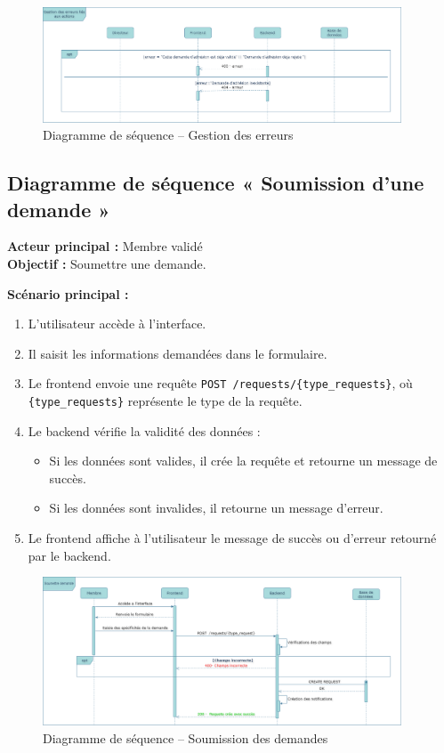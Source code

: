 \begin{figure}[H]
  \centering
  \includegraphics[width=0.95\textwidth]{images/diagramme_de_sequence/gestion_des_erreurs.png}
  \caption{Diagramme de séquence – Gestion des erreurs}
\end{figure}

\subsection{Diagramme de séquence « Soumission d'une demande »}

\textbf{Acteur principal :} Membre validé \\
\textbf{Objectif :} Soumettre une demande.

\textbf{Scénario principal :}
\begin{enumerate}
  \item L'utilisateur accède à l'interface.
  \item Il saisit les informations demandées dans le formulaire.
  \item Le frontend envoie une requête \texttt{POST /requests/\{type\_requests\}}, où \texttt{\{type\_requests\}} représente le type de la requête.
  \item Le backend vérifie la validité des données :
  \begin{itemize}
    \item Si les données sont valides, il crée la requête et retourne un message de succès.
    \item Si les données sont invalides, il retourne un message d'erreur.
  \end{itemize}
  \item Le frontend affiche à l'utilisateur le message de succès ou d'erreur retourné par le backend.
\end{enumerate}

\begin{figure}[H]
  \centering
  \includegraphics[width=0.95\textwidth]{images/diagramme_de_sequence/soumettre_demande.drawio.png}
  \caption{Diagramme de séquence – Soumission des demandes}
\end{figure}

